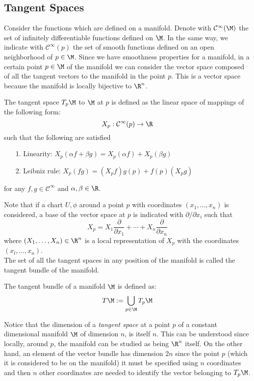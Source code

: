 \subsection{Tangent Spaces}\label{tangentspaces}
%
Consider the functions which are defined on a manifold. Denote with $\mathcal{C}^{\infty}(\M)$ the set of infinitely differentiable functions defined on $\M$. In
the same way, we indicate with $\mathcal{C}^{\infty}(p)$ the set of smooth functions defined on an open neighborhood of  $p\in \M$. Since we have smoothness properties for a manifold, in a certain point  $p\in \M$ of the manifold we can consider the vector space composed of all the tangent vectors to the manifold in the point $p$. This is a vector space because the manifold is locally bijective to $\R^n$.
%
\begin{defn}
	The tangent space $T_p\M$ to $\M$ at $p$ is defined as the linear space of mappings of the following form:
	\begin{equation*}
	X_p:\mathcal{C}^{\infty}(p)\rightarrow\R
	\end{equation*} 
	such that the following are satisfied
	\begin{itemize}
		\item[1.] Linearity: $X_p(\alpha f + \beta g) = X_p(\alpha f) + X_p(\beta g)$
		\item[2.] Leibniz rule: $X_p(fg) = (X_p f)g(p) + f(p)(X_pg)$
	\end{itemize}
	for any $f,g\in\mathcal{C}^{\infty}$ and $\alpha,\beta\in\R$.
\end{defn}
%
Note that if a chart $U,\phi$ around a point $p$ with coordinates $(x_1,..., x_n)$ is considered, a base of the vector space at $p$ is indicated with ${\partial/\partial x_i}$ such that 
%
\begin{equation*}
X_p = X_1\frac{\partial}{\partial x_1} +\cdots + X_n \frac{\partial}{\partial x_n}
\end{equation*}
%
where $(X_1,\dots, X_n)\in\R^n$ is a local representation of $X_p$ with the coordinates $(x_l,\dots,x_n)$.\\
%
The set of all the tangent spaces in any position of the manifold is called the tangent bundle of the manifold.
%
\begin{defn}
	The tangent bundle of a manifold $\M$ is defined as:
	\begin{equation*}
	T\M:=\bigcup\limits_{p\in\M} {T_p\M}
	\end{equation*}
\end{defn}
%
Notice that the dimension of a\textit{ tangent space} at a point $p$ of a constant dimensional manifold $\M$ of dimension $n$, is itself $n$. This can be understood since locally, around $p$, the manifold can be studied as being $\R^n$ itself. On the other hand, an element of the vector bundle has dimension $2n$ since the point $p$ (which it is considered to be on the manifold) it must be specified using $n$ coordinates and then $n$ other
coordinates are needed to identify the vector belonging to $T_p\M$.
%

